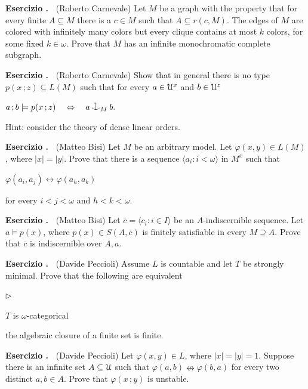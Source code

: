 \documentclass[10pt]{article}
\def\phi{\varphi}
\def\U{\EuScript U}
\def\niff{\nleftrightarrow}
\def\iff{\leftrightarrow}
\def\IFF{\Leftrightarrow}
\def\cnonfork{\mathbin{\raise1.8ex\rlap{\kern0.6ex\rule{0.6ex}{0.1ex}}\rlap{\kern1.1ex\rule{0.1ex}{1.9ex}}\raise-0.3ex\hbox{$\smile$} } }
\newcommand{\labella}[1]{{\sf\footnotesize #1}\hfill}
\renewenvironment{itemize}
  {\begin{list}{$\triangleright$}{%
   \setlength{\parskip}{0mm}
   \setlength{\topsep}{0mm}
   \setlength{\rightmargin}{0mm}
   \setlength{\listparindent}{0mm}
   \setlength{\itemindent}{0mm}
   \setlength{\labelwidth}{3ex}
   \setlength{\itemsep}{0mm}
   \setlength{\parsep}{0mm}
   \setlength{\partopsep}{0mm}
   \setlength{\labelsep}{1ex}
   \setlength{\leftmargin}{\labelwidth+\labelsep}
   \let\makelabel\labella}}{%
   \vspace*{-.3\baselineskip}
  \end{list}}
\newcounter{ex}
\newenvironment{exercise}{\bigskip\par\addtocounter{ex}{1}\textbf{Esercizio \theex.\ }}{}
\begin{document}
\begin{exercise}
  (Roberto Carnevale)
  Let $M$ be a graph with the property that for every finite $A\subseteq M$ there is a $c\in M$ such that $A\subseteq r(c,M)$.
  The edges of $M$ are colored with infinitely many colors but every clique contains at most $k$ colors, for some fixed $k\in\omega$.
  Prove that $M$ has an infinite monochromatic complete subgraph.
\end{exercise}
\begin{exercise}
  (Roberto Carnevale)
  Show that in general there is no type $p(x\,;z)\subseteq L(M)$ such that for every  $a\in\U^x$ and $b\in\U^z$\vspace*{-1ex}

  \hfil$a\,;b\models p(x\,;z)\ \ \ \IFF\ \ \ a\cnonfork_M b.$\vspace*{-1ex}

  Hint: consider the theory of dense linear orders.
\end{exercise}
\begin{exercise}
  (Matteo Bisi)
  Let $M$ be an arbitrary model.
  Let $\phi(x,y)\in L(M)$, where $|x|=|y|$.
  Prove that there is a sequence $\langle a_i:i<\omega\rangle$ in $M^{x}$ such that\vspace*{-1ex}

  \hfil$\phi(a_i,a_j)\iff\phi(a_h,a_k)$\vspace*{-1ex}

  for every $i<j<\omega$ and $h<k<\omega$.
\end{exercise}
\begin{exercise}
  (Matteo Bisi)
  Let $\bar c=\langle c_i:i\in I\rangle$ be an $A$-indiscernible sequence.
  Let $a\models p(x)$, where $p(x)\in S(A,\bar c)$ is finitely satisfiable in every $M\supseteq A$.
  Prove that $\bar c$ is indiscernible over $A,a$.
\end{exercise}
\begin{exercise}
  (Davide Peccioli)
  Assume $L$ is countable and let $T$ be strongly minimal.
  Prove that the following are equivalent
  \begin{itemize}
  \item[1.] $T$ is $\omega$-categorical
  \item[2.] the algebraic closure of a finite set is finite.
  \end{itemize}
\end{exercise}
\begin{exercise}
  (Davide Peccioli)
  Let $\phi(x,y)\in  L$, where $|x|=|y|=1$.
  Suppose there is an infinite set $A\subseteq\U$ such that $\phi(a,b)\niff\phi(b,a)$ for every two distinct $a,b\in A$.
  Prove that $\phi(x\,;y)$ is unstable.
\end{exercise}
\end{document}
